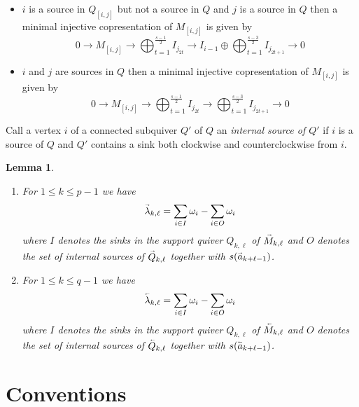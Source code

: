 \documentclass[12pt]{amsart}
\renewcommand{\vec}[1]{\accentset{\shortrightarrow}{#1}}
\newcommand{\cev}[1]{\accentset{\shortleftarrow}{#1}}
\newtheorem{lemma}[theorem]{Lemma}
\theoremstyle{remark}
\numberwithin{equation}{section}
\begin{document}
\begin{itemize}
    \item $i$ is a source in $Q_{[i,j]}$ but not a source in $Q$ and $j$ is a source in $Q$ then a minimal injective copresentation of $M_{[i,j]}$ is given by
    \[0\longrightarrow M_{[i,j]}\longrightarrow\bigoplus_{t=1}^{\frac{s-1}{2}} I_{j_{2t}}\longrightarrow I_{i-1}\oplus\bigoplus_{t=1}^{\frac{s-3}{2}} I_{j_{2t+1}}\longrightarrow0\]
    \item $i$ and $j$ are sources in $Q$ then a minimal injective copresentation of $M_{[i,j]}$ is given by
    \[0\longrightarrow M_{[i,j]}\longrightarrow\bigoplus_{t=1}^{\frac{s-1}{2}} I_{j_{2t}}\longrightarrow\bigoplus_{t=1}^{\frac{s-3}{2}} I_{j_{2t+1}}\longrightarrow0\]
  \end{itemize}

  Call a vertex $i$ of a connected subquiver $Q'$ of $Q$ an \emph{internal source of $Q'$} if $i$ is a source of $Q$ and $Q'$ contains a sink both clockwise and counterclockwise from $i$.
  \begin{lemma}\mbox{}
    \begin{enumerate}
      \item For $1\le k\le p-1$ we have
      \[\vec{\lambda}_{k,\ell}=\sum_{i\in I}\omega_i-\sum_{i\in O}\omega_i\]
      where $I$ denotes the sinks in the support quiver $Q_{k,\ell}$ of $\vec{M}_{k,\ell}$ and $O$ denotes the set of internal sources of $\vec{Q}_{k,\ell}$ together with $s(\vec{a}_{k+\ell-1})$.
      \item For $1\le k\le q-1$ we have
      \[\cev{\lambda}_{k,\ell}=\sum_{i\in I}\omega_i-\sum_{i\in O}\omega_i\]
      where $I$ denotes the sinks in the support quiver $Q_{k,\ell}$ of $\cev{M}_{k,\ell}$ and $O$ denotes the set of internal sources of $\cev{Q}_{k,\ell}$ together with $s(\cev{a}_{k+\ell-1})$.
    \end{enumerate}
  \end{lemma}



\section{Conventions}
\end{document}
